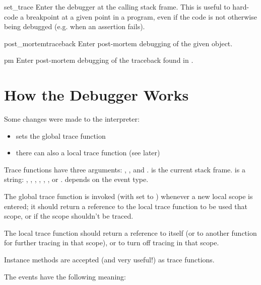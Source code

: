 \begin{funcdesc}{set_trace}{}
Enter the debugger at the calling stack frame.  This is useful to
hard-code a breakpoint at a given point in a program, even if the code
is not otherwise being debugged (e.g. when an assertion fails).
\end{funcdesc}

\begin{funcdesc}{post_mortem}{traceback}
Enter post-mortem debugging of the given  object.
\end{funcdesc}

\begin{funcdesc}{pm}{}
Enter post-mortem debugging of the traceback found in
.
\end{funcdesc}

\section{How the Debugger Works \label{debugger-hooks}}

Some changes were made to the interpreter:

\begin{itemize}
\item {} sets the global trace function
\item there can also a local trace function (see later)
\end{itemize}

Trace functions have three arguments: , , and
.  is the current stack frame.   is a
string: , , , ,
 , , or . 
 depends on the event type.

The global trace function is invoked (with  set to
) whenever a new local scope is entered; it should return
a reference to the local trace function to be used that scope, or
 if the scope shouldn't be traced.

The local trace function should return a reference to itself (or to
another function for further tracing in that scope), or  to
turn off tracing in that scope.

Instance methods are accepted (and very useful!) as trace functions.

The events have the following meaning:


